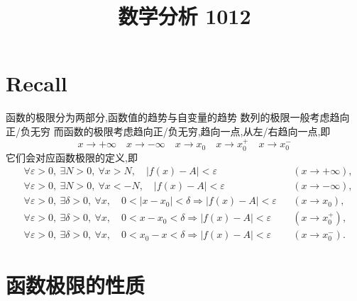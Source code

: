 \documentclass[UTF8,11pt]{ctexart}
\title{数学分析 1012}
\date{}
\theoremstyle{cnthm}
\begin{document}
\maketitle

\section{Recall}

函数的极限分为两部分,函数值的趋势与自变量的趋势
数列的极限一般考虑趋向正/负无穷
而函数的极限考虑趋向正/负无穷,趋向一点,从左/右趋向一点,即
$$
x \to +\infty \quad x \to -\infty \quad x \to x_0 \quad x \to x_0^+ \quad x \to x_0^-
$$
它们会对应函数极限的定义,即
\[
\begin{aligned}
&\forall\varepsilon>0,\ \exists N>0,\ \forall x>N,\quad
|f(x)-A|<\varepsilon &&(x\to+\infty),\\
&\forall\varepsilon>0,\ \exists N>0,\ \forall x<-N,\quad
|f(x)-A|<\varepsilon &&(x\to-\infty),\\
&\forall\varepsilon>0,\ \exists\delta>0,\ \forall x,\quad
0<|x-x_0|<\delta\Longrightarrow |f(x)-A|<\varepsilon
&&(x\to x_0),\\
&\forall\varepsilon>0,\ \exists\delta>0,\ \forall x,\quad
0<x-x_0<\delta\Longrightarrow |f(x)-A|<\varepsilon
&&(x\to x_0^+),\\
&\forall\varepsilon>0,\ \exists\delta>0,\ \forall x,\quad
0<x_0-x<\delta\Longrightarrow |f(x)-A|<\varepsilon
&&(x\to x_0^-).
\end{aligned}
\]
\section{函数极限的性质}
\end{document}
